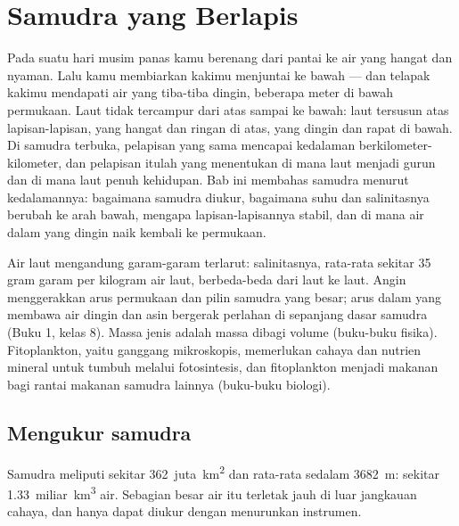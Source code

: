 \chapter{Samudra yang Berlapis}\label{ch:g10:layered-ocean}

Pada suatu hari musim panas kamu berenang dari pantai ke air yang hangat dan
nyaman. Lalu kamu membiarkan kakimu menjuntai ke bawah --- dan telapak kakimu
mendapati air yang tiba-tiba dingin, beberapa meter di bawah permukaan. Laut
tidak tercampur dari atas sampai ke bawah: laut tersusun atas lapisan-lapisan,
yang hangat dan ringan di atas, yang dingin dan rapat di bawah. Di samudra
terbuka, pelapisan yang sama mencapai kedalaman berkilometer-kilometer, dan
pelapisan itulah yang menentukan di mana laut menjadi gurun dan di mana laut
penuh kehidupan. Bab ini membahas samudra menurut kedalamannya: bagaimana
samudra diukur, bagaimana suhu dan salinitasnya berubah ke arah bawah, mengapa
lapisan-lapisannya stabil, dan di mana air dalam yang dingin naik kembali ke
permukaan.

\begin{recall}
Air laut mengandung garam-garam terlarut: salinitasnya, rata-rata sekitar 35
gram garam per kilogram air laut, berbeda-beda dari laut ke laut. Angin
menggerakkan arus permukaan dan pilin samudra yang besar; arus dalam yang
membawa air dingin dan asin bergerak perlahan di sepanjang dasar samudra
(Buku 1, kelas 8). Massa jenis adalah massa dibagi volume (buku-buku fisika).
Fitoplankton, yaitu ganggang mikroskopis, memerlukan cahaya dan nutrien
mineral untuk tumbuh melalui fotosintesis, dan fitoplankton menjadi makanan
bagi rantai makanan samudra lainnya (buku-buku biologi).
\end{recall}

\section{Mengukur samudra}

Samudra meliputi sekitar \num{362}~juta~\unit{km^2} dan rata-rata sedalam
\qty{3682}{m}: sekitar \num{1.33}~miliar~\unit{km^3} air. Sebagian besar air
itu terletak jauh di luar jangkauan cahaya, dan hanya dapat diukur dengan
menurunkan instrumen.

